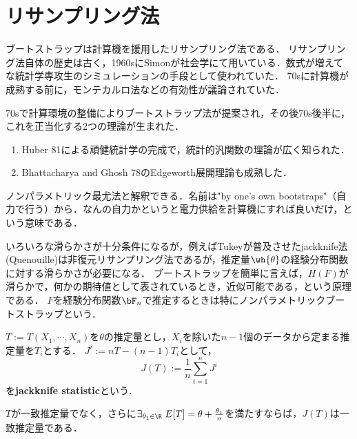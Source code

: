 \documentclass[uplatex,dvipdfmx]{jsreport}
\begin{document}
\section{リサンプリング法}

\begin{history}
    ブートストラップは計算機を援用したリサンプリング法である．
    リサンプリング法自体の歴史は古く，1960sにSimonが社会学にて用いている．数式が増えてな統計学専攻生のシミュレーションの手段として使われていた．
    70sに計算機が成熟する前に，モンテカルロ法などの有効性が議論されていた．
\end{history}

\begin{history}[Bootstrapの正当化]
    70sで計算環境の整備によりブートストラップ法が提案され，その後70s後半に，これを正当化する2つの理論が生まれた．
    \begin{enumerate}
        \item Huber 81による頑健統計学の完成で，統計的汎関数の理論が広く知られた．
        \item Bhattacharya and Ghosh 78のEdgeworth展開理論も成熟した．
    \end{enumerate}
    ノンパラメトリック最尤法と解釈できる．名前は"by one's own bootstraps"（自力で行う）から．なんの自力かというと電力供給を計算機にすれば良いだけ，という意味である．
\end{history}

\begin{discussion}
    いろいろな滑らかさが十分条件になるが，例えばTukeyが普及させたjackknife法(Quenouille)は非復元リサンプリング法であるが，推定量$\wh{\theta}$の経験分布関数に対する滑らかさが必要になる．
    ブートストラップを簡単に言えば，$H(F)$が滑らかで，何かの期待値として表されているとき，近似可能である，という原理である．
    $F$を経験分布関数$\bF_n$で推定するときは特にノンパラメトリックブートストラップという．
\end{discussion}

\begin{definition}
    $T:=T(X_1,\cdots,X_n)$を$\theta$の推定量とし，$X_i$を除いた$n-1$個のデータから定まる推定量を$T_i$とする．
    $J^i:=nT-(n-1)T_i$として，
    \[J(T):=\frac{1}{n}\sum_{i=1}^nJ^i\]
    を\textbf{jackknife statistic}という．
\end{definition}

\begin{theorem}
    $T$が一致推定量でなく，さらに$\exists_{\theta_1\in\R}\;E[T]=\theta+\frac{\theta_1}{n}$を満たすならば，$J(T)$は一致推定量である．
\end{theorem}
\end{document}
